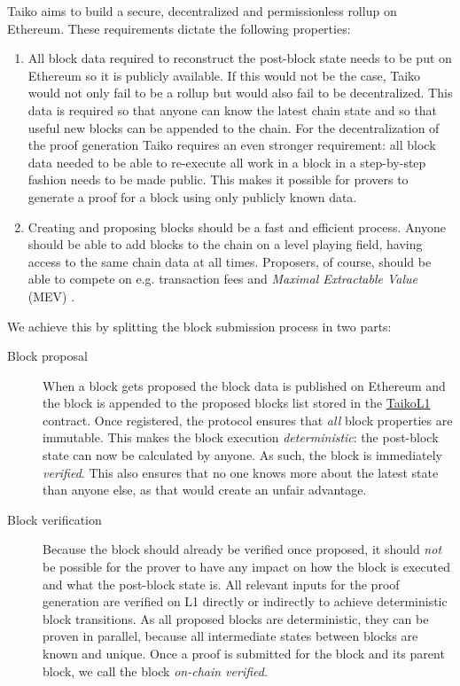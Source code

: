 \documentclass[9pt,oneside]{amsart}
\begin{document}
\begin{multicols}{2}
Taiko aims to build a secure, decentralized and permissionless rollup on Ethereum. These requirements dictate the following properties:
\begin{enumerate}
\item All block data required to reconstruct the post-block state needs to be put on Ethereum so it is publicly available. If this would not be the case, Taiko would not only fail to be a rollup but would also fail to be decentralized. This data is required so that anyone can know the latest chain state and so that useful new blocks can be appended to the chain. For the decentralization of the proof generation Taiko requires an even stronger requirement: all block data needed to be able to re-execute all work in a block in a step-by-step fashion needs to be made public. This makes it possible for provers to generate a proof for a block using only publicly known data.
\item Creating and proposing blocks should be a fast and efficient process. Anyone should be able to add blocks to the chain on a level playing field, having access to the same chain data at all times. Proposers, of course, should be able to compete on e.g. transaction fees and \emph{Maximal Extractable Value} (MEV) \cite{mev}.
\end{enumerate}

We achieve this by splitting the block submission process in two parts:
\begin{description}
\item[Block proposal] When a block gets proposed the block data is published on Ethereum and the block is appended to the proposed blocks list stored in the \underline{TaikoL1} contract. Once registered, the protocol ensures that \emph{all} block properties are immutable. This makes the block execution \emph{deterministic}: the post-block state can now be calculated by anyone. As such, the block is immediately \emph{verified}. This also ensures that no one knows more about the latest state than anyone else, as that would create an unfair advantage.
\item[Block verification] Because the block should already be verified once proposed, it should \emph{not} be possible for the prover to have any impact on how the block is executed and what the post-block state is. All relevant inputs for the proof generation are verified on L1 directly or indirectly to achieve deterministic block transitions. As all proposed blocks are deterministic, they can be proven in parallel, because all intermediate states between blocks are known and unique. Once a proof is submitted for the block and its parent block, we call the block \emph{on-chain verified}.
\end{description}


\end{multicols}
\end{document}
